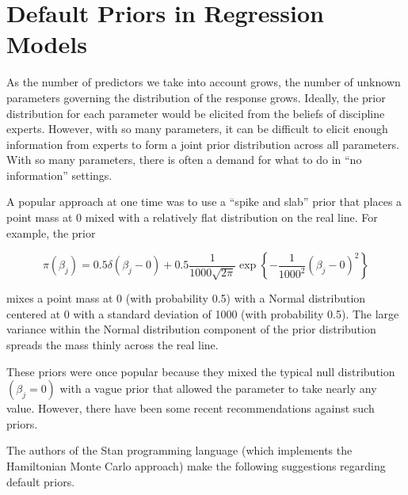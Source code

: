 \documentclass[
  letterpaper,
  DIV=11,
  numbers=noendperiod]{scrreprt}
\theoremstyle{definition}
\theoremstyle{plain}
\theoremstyle{definition}
\theoremstyle{remark}
\begin{document}
\hypertarget{sec-reg-priors}{%
\chapter{Default Priors in Regression Models}\label{sec-reg-priors}}

\providecommand{\norm}[1]{\lVert#1\rVert}
\providecommand{\abs}[1]{\lvert#1\rvert}
\providecommand{\iid}{\stackrel{\text{IID}}{\sim}}
\providecommand{\ind}{\stackrel{\text{Ind}}{\sim}}

\providecommand{\bm}[1]{\mathbf{#1}}
\providecommand{\bs}[1]{\boldsymbol{#1}}
\providecommand{\bbeta}{\bs{\beta}}

\providecommand{\Ell}{\mathcal{L}}
\providecommand{\indep}{\perp\negthickspace\negmedspace\perp}

As the number of predictors we take into account grows, the number of
unknown parameters governing the distribution of the response grows.
Ideally, the prior distribution for each parameter would be elicited
from the beliefs of discipline experts. However, with so many
parameters, it can be difficult to elicit enough information from
experts to form a joint prior distribution across all parameters. With
so many parameters, there is often a demand for what to do in ``no
information'' settings.

A popular approach at one time was to use a ``spike and slab'' prior
that places a point mass at 0 mixed with a relatively flat distribution
on the real line. For example, the prior

\[\pi\left(\beta_j\right) = 0.5 \delta\left(\beta_j - 0\right) + 0.5 \frac{1}{1000 \sqrt{2 \pi}} \exp\left\{-\frac{1}{1000^2} \left(\beta_j - 0 \right)^2\right\}\]

mixes a point mass at 0 (with probability 0.5) with a Normal
distribution centered at 0 with a standard deviation of 1000 (with
probability 0.5). The large variance within the Normal distribution
component of the prior distribution spreads the mass thinly across the
real line.

These priors were once popular because they mixed the typical null
distribution \(\left(\beta_j = 0\right)\) with a vague prior that
allowed the parameter to take nearly any value. However, there have been
some recent recommendations against such priors.

The authors of the Stan programming language (which implements the
Hamiltonian Monte Carlo approach) make the following suggestions
regarding default priors.
\end{document}
